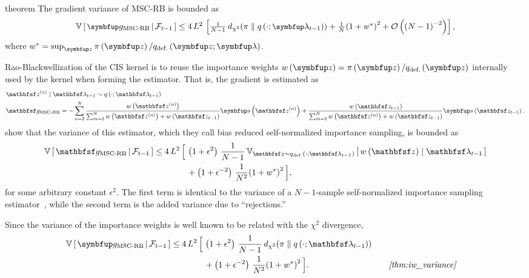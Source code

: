 \begin{theoremEnd}{theorem}{\citep{cardoso_brsnis_2022}}\label{thm:mscrb}
  The gradient variance of MSC-RB is bounded as
  \begin{align*}
  {\textstyle\small
    \V{ \vg_{\mathrm{MSC\text{-}RB}} \,\middle|\, \mathcal{F}_{t-1} } \leq
    4\,L^2 \, \left[
    \frac{1}{N-1}\,\DChi{\pi}{q\left(\cdot; \vlambda_{t-1}\right)}
    +
    \frac{1}{N} {\left(1 + w^*\right)}^2
    +
    \mathcal{O}\left({\left(N-1\right)}^{-2}\right)
    \right],
  }
  \end{align*}
  where \(w^* = \sup_{\vz} \pi\left(\vz\right) / q_{\text{def.}}\left(\vz;\vlambda\right)\).
\end{theoremEnd}
\begin{proofEnd}
  Rao-Blackwellization of the CIS kernel is to reuse the importance weights \(w\left(\vz\right) = \pi\left(\vz\right) / q_{\text{def.}}\left(\vz\right)\) internally used by the kernel when forming the estimator.
  That is, the gradient is estimated as
  \begin{align*}
    &\rvvz^{(n)} \mid \rvvlambda_{t-1} \sim q\left(\cdot; \rvvlambda_{t-1}\right) \\
    &\rvvg_{\text{MSC-RB}} = -\sum^{N}_{n=2} \frac{w\left(\rvvz^{(n)}\right)}{\sum^{N}_{m=2}w\left(\rvvz^{(n)}\right) + w\left(\rvvz_{t-1}\right)} \vs\left(\rvvz^{(n)}\right) + \frac{w\left(\rvvz_{t-1}\right)}{\sum^{N}_{m=2}w\left(\rvvz^{(n)}\right) + w\left(\rvvz_{t-1}\right)} \vs\left(\rvvz_{t-1}\right).
  \end{align*}
  \citet[Theorem 3]{cardoso_brsnis_2022} show that the variance of this estimator, which they call bias reduced self-normalized importance sampling, is bounded as
  \begin{align*}
    \V{ \rvvg_{\text{MSC-RB}} \,\middle|\, \mathcal{F}_{t-1} } \leq
    4\,L^2 \, \Big[\,&
     \left( 1 + \epsilon^2 \right)\, \frac{1}{N-1}\,\Vsub{\rvvz \sim q_{\text{def.}}\left(\cdot; \rvvlambda_{t-1}\right)}{w\left(\rvvz\right) \mid \rvvlambda_{t-1}} 
     \\
     &+
     \left(1 + \epsilon^{-2} \right)\, \frac{1}{N^2} {\left(1 + w^*\right)}^2 
    \,\Big],
  \end{align*}
  for some arbitrary constant \(\epsilon^2\).
  The first term is identical to the variance of a \(N-1\)-sample self-normalized importance sampling estimator~\citep{10.1214/17-STS611}, while the second term is the added variance due to ``rejections.''

  Since the variance of the importance weights is well known to be related with the \(\chi^2\) divergence,
  \begin{alignat}{2}
    \V{ \vg_{\text{MSC-RB}} \,\middle|\, \mathcal{F}_{t-1} } \leq
    4\,L^2 \, \Big[\,&
     \left( 1 + \epsilon^2 \right)\, \frac{1}{N-1}\,\DChi{\pi}{q\left(\cdot; \rvvlambda_{t-1}\right)}
    \nonumber
     \\
     &+
     \left(1 + \epsilon^{-2} \right)\, \frac{1}{N^2} {\left(1 + w^*\right)}^2 
    \,\Big].
    &&\quad\text{\textit{\cref{thm:iw_variance}}}
    \nonumber
  \end{alignat}


\end{proofEnd}

